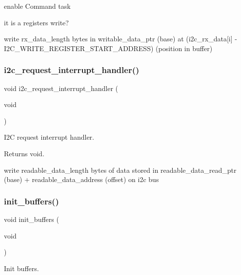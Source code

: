 enable Command task

it is a registers write?

write rx\+\_\+data\+\_\+length bytes in writable\+\_\+data\+\_\+ptr (base) at (i2c\+\_\+rx\+\_\+data\mbox{[}i\mbox{]} -\/ I2\+C\+\_\+\+W\+R\+I\+T\+E\+\_\+\+R\+E\+G\+I\+S\+T\+E\+R\+\_\+\+S\+T\+A\+R\+T\+\_\+\+A\+D\+D\+R\+E\+SS) (position in buffer) \mbox{\label{i2c-th_8ino_ac816bd8aafe77e7a571574c8a26eead5}} 
\subsubsection{\texorpdfstring{i2c\+\_\+request\+\_\+interrupt\+\_\+handler()}{i2c\_request\_interrupt\_handler()}}
{\footnotesize\ttfamily void i2c\+\_\+request\+\_\+interrupt\+\_\+handler (\begin{DoxyParamCaption}\item[{void}]{ }\end{DoxyParamCaption})}



I2C request interrupt handler. 

\begin{DoxyReturn}{Returns}
void. 
\end{DoxyReturn}
write readable\+\_\+data\+\_\+length bytes of data stored in readable\+\_\+data\+\_\+read\+\_\+ptr (base) + readable\+\_\+data\+\_\+address (offset) on i2c bus \mbox{\label{i2c-th_8ino_ad241cc00b1a92e6d85827df96778e442}} 
\subsubsection{\texorpdfstring{init\+\_\+buffers()}{init\_buffers()}}
{\footnotesize\ttfamily void init\+\_\+buffers (\begin{DoxyParamCaption}\item[{void}]{ }\end{DoxyParamCaption})}



Init buffers. 

